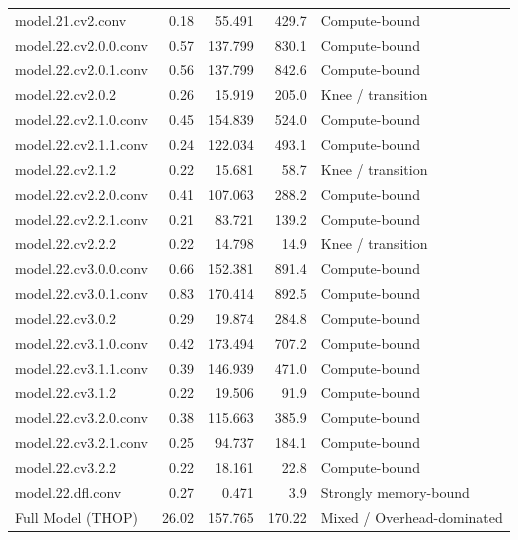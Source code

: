 \documentclass[12pt,a4paper]{report}
\begin{document}
\begin{longtable}{p{} r r r p{}}
model.21.cv2.conv                    & 0.18 & 55.491  & 429.7 & Compute-bound \\
model.22.cv2.0.0.conv                & 0.57 & 137.799 & 830.1 & Compute-bound \\
model.22.cv2.0.1.conv                & 0.56 & 137.799 & 842.6 & Compute-bound \\
model.22.cv2.0.2                     & 0.26 & 15.919  & 205.0 & Knee / transition \\
model.22.cv2.1.0.conv                & 0.45 & 154.839 & 524.0 & Compute-bound \\
model.22.cv2.1.1.conv                & 0.24 & 122.034 & 493.1 & Compute-bound \\
model.22.cv2.1.2                     & 0.22 & 15.681  & 58.7  & Knee / transition \\
model.22.cv2.2.0.conv                & 0.41 & 107.063 & 288.2 & Compute-bound \\
model.22.cv2.2.1.conv                & 0.21 & 83.721  & 139.2 & Compute-bound \\
model.22.cv2.2.2                     & 0.22 & 14.798  & 14.9  & Knee / transition \\
model.22.cv3.0.0.conv                & 0.66 & 152.381 & 891.4 & Compute-bound \\
model.22.cv3.0.1.conv                & 0.83 & 170.414 & 892.5 & Compute-bound \\
model.22.cv3.0.2                     & 0.29 & 19.874  & 284.8 & Compute-bound \\
model.22.cv3.1.0.conv                & 0.42 & 173.494 & 707.2 & Compute-bound \\
model.22.cv3.1.1.conv                & 0.39 & 146.939 & 471.0 & Compute-bound \\
model.22.cv3.1.2                     & 0.22 & 19.506  & 91.9  & Compute-bound \\
model.22.cv3.2.0.conv                & 0.38 & 115.663 & 385.9 & Compute-bound \\
model.22.cv3.2.1.conv                & 0.25 & 94.737  & 184.1 & Compute-bound \\
model.22.cv3.2.2                     & 0.22 & 18.161  & 22.8  & Compute-bound \\
model.22.dfl.conv                    & 0.27 & 0.471   & 3.9   & Strongly memory-bound \\
\midrule
Full Model (THOP)                    & 26.02 & 157.765 & 170.22 & Mixed / Overhead-dominated \\

\end{longtable}
\endgroup
    
\end{document}
